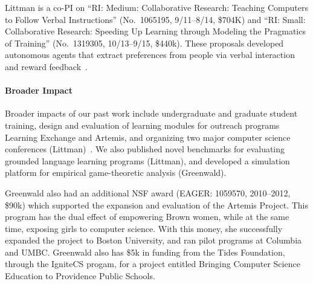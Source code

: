 Littman is a co-PI on ``RI: Medium: Collaborative Research: Teaching
Computers to Follow Verbal Instructions'' (No.\ 1065195, 9/11--8/14,
\$704K) and ``RI: Small: Collaborative Research: Speeding Up Learning
through Modeling the Pragmatics of Training'' (No.\ 1319305,
10/13--9/15, \$440k). These proposals developed autonomous agents that
extract preferences from people via verbal interaction and reward
feedback~\cite{loftin14b,macglashan15,macglashan15b}.

\vspace{\up}
\paragraph{Broader Impact}

Broader impacts of our past work include undergraduate and graduate
student training, design and evaluation of learning modules for
outreach programs Learning Exchange and Artemis, and organizing two
major computer science conferences (Littman)~\cite{desjardins13}.
We also published novel benchmarks for evaluating grounded language
learning programs (Littman), and developed a simulation platform for
empirical game-theoretic analysis (Greenwald).

Greenwald also had an additional NSF award (EAGER: 1059570,
2010--2012, \$90k) which supported the expansion and evaluation of the
Artemis Project.
This program has the dual effect of empowering Brown women, while at
the same time, exposing girls to computer science.  With this money,
she successfully expanded the project to Boston University, and ran
pilot programs at Columbia and UMBC.
%
Greenwald also has \$5k in funding from the Tides Foundation, through
the IgniteCS progam, for a project entitled Bringing Computer Science
Education to Providence Public Schools.

